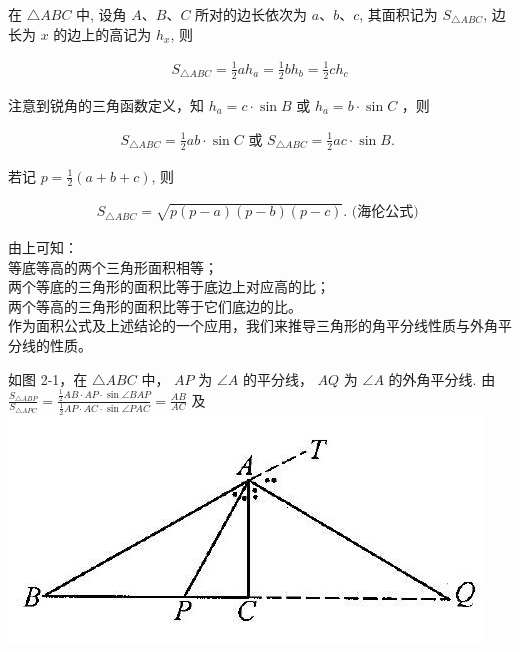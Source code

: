 \documentclass[10pt]{article}
\begin{document}
在 $\triangle A B C$ 中, 设角 $A 、 B 、 C$ 所对的边长依次为 $a 、 b 、 c$, 其面积记为 $S_{\triangle A B C}$, 边长为 $x$ 的边上的高记为 $h_{x}$, 则

\begin{align*}
S_{\triangle A B C}=\frac{1}{2} a h_{a}=\frac{1}{2} b h_{b}=\frac{1}{2} c h_{c} \tag{2-1}
\end{align*}

注意到锐角的三角函数定义，知 $h_{a}=c \cdot \sin B$ 或 $h_{a}=b \cdot \sin C$ ，则

\begin{align*}
S_{\triangle A B C}=\frac{1}{2} a b \cdot \sin C \text { 或 } S_{\triangle A B C}=\frac{1}{2} a c \cdot \sin B \text {. } \tag{2-2}
\end{align*}

若记 $p=\frac{1}{2}(a+b+c)$, 则

\begin{align*}
S_{\triangle A B C}=\sqrt{p(p-a)(p-b)(p-c)} . \text { (海伦公式) } \tag{2-3}
\end{align*}

由上可知：\\
等底等高的两个三角形面积相等；\\
两个等底的三角形的面积比等于底边上对应高的比；\\
两个等高的三角形的面积比等于它们底边的比。\\
作为面积公式及上述结论的一个应用，我们来推导三角形的角平分线性质与外角平分线的性质。

如图 2-1，在 $\triangle A B C$ 中， $A P$ 为 $\angle A$ 的平分线， $A Q$ 为 $\angle A$ 的外角平分线. 由 $\frac{S_{\triangle A B P}}{S_{\triangle A P C}}=\frac{\frac{1}{2} A B \cdot A P \cdot \sin \angle B A P}{\frac{1}{2} A P \cdot A C \cdot \sin \angle P A C}=\frac{A B}{A C}$ 及\\
\includegraphics[max width=\textwidth, center]{2024_10_30_2c8f45efd4a519b08e1ag-014}
\end{document}
